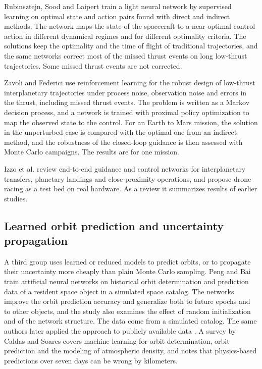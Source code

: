 Rubinsztejn, Sood and Laipert \cite{rubinsztejn2020} train a light neural network by supervised learning on optimal state and action pairs found with direct and indirect methods. The network maps the state of the spacecraft to a near-optimal control action in different dynamical regimes and for different optimality criteria. The solutions keep the optimality and the time of flight of traditional trajectories, and the same networks correct most of the missed thrust events on long low-thrust trajectories. Some missed thrust events are not corrected.

Zavoli and Federici \cite{zavoli2021} use reinforcement learning for the robust design of low-thrust interplanetary trajectories under process noise, observation noise and errors in the thrust, including missed thrust events. The problem is written as a Markov decision process, and a network is trained with proximal policy optimization to map the observed state to the control. For an Earth to Mars mission, the solution in the unperturbed case is compared with the optimal one from an indirect method, and the robustness of the closed-loop guidance is then assessed with Monte Carlo campaigns. The results are for one mission.

Izzo et al. \cite{izzo2024} review end-to-end guidance and control networks for interplanetary transfers, planetary landings and close-proximity operations, and propose drone racing as a test bed on real hardware. As a review it summarizes results of earlier studies.

\subsection{Learned orbit prediction and uncertainty propagation}
\label{sec:rw-orbit}

A third group uses learned or reduced models to predict orbits, or to propagate their uncertainty more cheaply than plain Monte Carlo sampling. Peng and Bai \cite{peng2018} train artificial neural networks on historical orbit determination and prediction data of a resident space object in a simulated space catalog. The networks improve the orbit prediction accuracy and generalize both to future epochs and to other objects, and the study also examines the effect of random initialization and of the network structure. The data come from a simulated catalog. The same authors later applied the approach to publicly available data \cite{peng2019}. A survey by Caldas and Soares \cite{caldas2024} covers machine learning for orbit determination, orbit prediction and the modeling of atmospheric density, and notes that physics-based predictions over seven days can be wrong by kilometers.

